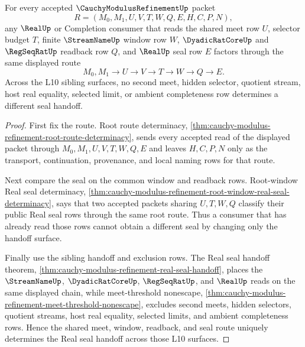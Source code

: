 \begin{theorem}
\label{thm:cauchy-modulus-refinement-window-meet-seal-unicity}
For every accepted $\CauchyModulusRefinementUp$ packet
$$
R=(M_0,M_1,U,V,T,W,Q,E,H,C,P,N),
$$
any $\RealUp$ or Completion consumer that reads the shared meet row $U$, selector budget $T$, finite $\StreamNameUp$ window row $W$, $\DyadicRatCoreUp$ and $\RegSeqRatUp$ readback row $Q$, and $\RealUp$ seal row $E$ factors through the same displayed route
$$
M_0,M_1 \longrightarrow U \longrightarrow V \longrightarrow T \longrightarrow W \longrightarrow Q \longrightarrow E.
$$
Across the L10 sibling surfaces, no second meet, hidden selector, quotient stream, host real equality, selected limit, or ambient completeness row determines a different seal handoff.
\end{theorem}
\begin{proof}
First fix the route. Root route determinacy, \autoref{thm:cauchy-modulus-refinement-root-route-determinacy}, sends every accepted read of the displayed packet through $M_0,M_1,U,V,T,W,Q,E$ and leaves $H,C,P,N$ only as the transport, continuation, provenance, and local naming rows for that route.

Next compare the seal on the common window and readback rows. Root-window Real seal determinacy, \autoref{thm:cauchy-modulus-refinement-root-window-real-seal-determinacy}, says that two accepted packets sharing $U,T,W,Q$ classify their public Real seal rows through the same root route. Thus a consumer that has already read those rows cannot obtain a different seal by changing only the handoff surface.

Finally use the sibling handoff and exclusion rows. The Real seal handoff theorem, \autoref{thm:cauchy-modulus-refinement-real-seal-handoff}, places the $\StreamNameUp$, $\DyadicRatCoreUp$, $\RegSeqRatUp$, and $\RealUp$ reads on the same displayed chain, while meet-threshold nonescape, \autoref{thm:cauchy-modulus-refinement-meet-threshold-nonescape}, excludes second meets, hidden selectors, quotient streams, host real equality, selected limits, and ambient completeness rows. Hence the shared meet, window, readback, and seal route uniquely determines the Real seal handoff across those L10 surfaces.
\end{proof}

